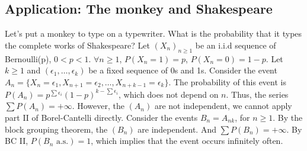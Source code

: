 \subsection{Application: The monkey and Shakespeare}%
Let's put a monkey to type on a typewriter. What is the probability that it types the complete works of Shakespeare?
Let $(X_n)_{n \ge 1}$ be an i.i.d sequence of Bernoulli(p), $0 < p < 1$.
$\forall n \ge 1$, $P(X_n=1)=p$, $P(X_n=0)=1-p$.
Let $k \ge 1$ and $(\epsilon_1, \dots, \epsilon_k)$ be a fixed sequence of 0s and 1s.
Consider the event $A_n = \{X_n=\epsilon_1, X_{n+1}=\epsilon_2, \dots, X_{n+k-1}=\epsilon_k\}$.
The probability of this event is $P(A_n) = p^{\sum \epsilon_i} (1-p)^{k-\sum \epsilon_i}$, which does not depend on $n$.
Thus, the series $\sum P(A_n) = +\infty$.
However, the $(A_n)$%
are not independent, we cannot apply part II of Borel-Cantelli directly.
Consider the events $B_n=A_{nk}$, for $n \ge 1$. By the block grouping theorem, the $(B_n)$ are independent.
And $\sum P(B_n)=+\infty$. By BC II, $P(B_n \text{ a.s.}) = 1$, which implies that the event occurs infinitely often.%
